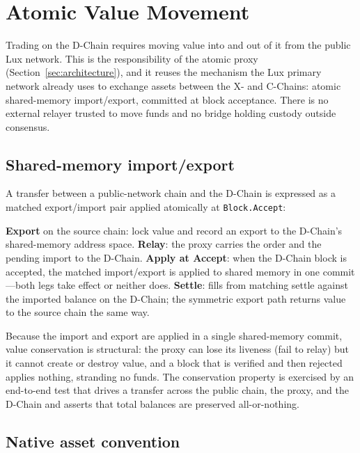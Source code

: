 \section{Atomic Value Movement}
\label{sec:cross-chain}

Trading on the D-Chain requires moving value into and out of it from the public Lux
network. This is the responsibility of the atomic proxy (Section~\ref{sec:architecture}),
and it reuses the mechanism the Lux primary network already uses to exchange assets
between the X- and C-Chains: atomic shared-memory import/export, committed at block
acceptance. There is no external relayer trusted to move funds and no bridge holding
custody outside consensus.

\subsection{Shared-memory import/export}

A transfer between a public-network chain and the D-Chain is expressed as a matched
export/import pair applied atomically at \texttt{Block.Accept}:

\begin{algorithm}[H]
\caption{Atomic import into the D-Chain}
\begin{algorithmic}[1]
\STATE \textbf{Export} on the source chain: lock value and record an export to the
D-Chain's shared-memory address space.
\STATE \textbf{Relay}: the proxy carries the order and the pending import to the D-Chain.
\STATE \textbf{Apply at Accept}: when the D-Chain block is accepted, the matched
import/export is applied to shared memory in one commit---both legs take effect or
neither does.
\STATE \textbf{Settle}: fills from matching settle against the imported balance on the
D-Chain; the symmetric export path returns value to the source chain the same way.
\end{algorithmic}
\end{algorithm}

Because the import and export are applied in a single shared-memory commit, value
conservation is structural: the proxy can lose its liveness (fail to relay) but it cannot
create or destroy value, and a block that is verified and then rejected applies nothing,
stranding no funds. The conservation property is exercised by an end-to-end test that
drives a transfer across the public chain, the proxy, and the D-Chain and asserts that
total balances are preserved all-or-nothing.

\subsection{Native asset convention}

